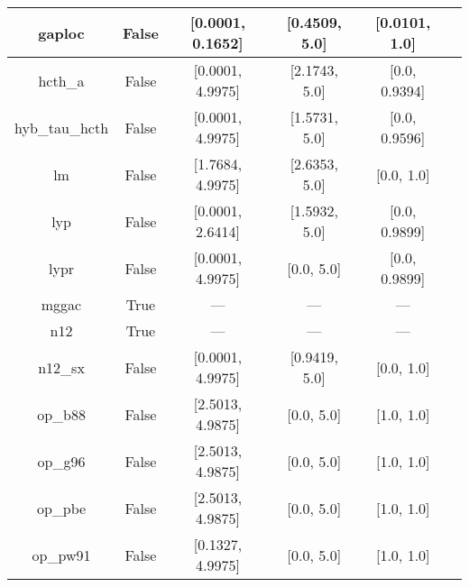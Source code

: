 \begin{tabular}{|c|c|c|c|c|l|}
        gaploc &                 False & [0.0001, 0.1652] &    [0.4509, 5.0] &    [0.0101, 1.0] &                                        \cite{Fabiano2014_2016} \\ \hline
       hcth\_a &                 False & [0.0001, 4.9975] &    [2.1743, 5.0] &    [0.0, 0.9394] &                                      \cite{Hamprecht1998_6264} \\ \hline
hyb\_tau\_hcth &                 False & [0.0001, 4.9975] &    [1.5731, 5.0] &    [0.0, 0.9596] &                                          \cite{Boese2002_9559} \\ \hline
            lm &                 False & [1.7684, 4.9975] &    [2.6353, 5.0] &       [0.0, 1.0] &                             \cite{Langreth1981_446,Hu1985_391} \\ \hline
           lyp &                 False & [0.0001, 2.6414] &    [1.5932, 5.0] &    [0.0, 0.9899] &                            \cite{Lee1988_785,Miehlich1989_200} \\ \hline
          lypr &                 False & [0.0001, 4.9975] &       [0.0, 5.0] &    [0.0, 0.9899] &                                             \cite{Ai2021_1207} \\ \hline
         mggac &                  True &              --- &              --- &              --- &                                        \cite{Patra2019_155140} \\ \hline
           n12 &                  True &              --- &              --- &              --- &                                       \cite{Peverati2012_2310} \\ \hline
       n12\_sx &                 False & [0.0001, 4.9975] &    [0.9419, 5.0] &       [0.0, 1.0] &                                      \cite{Peverati2012_16187} \\ \hline
       op\_b88 &                 False & [2.5013, 4.9875] &       [0.0, 5.0] &       [1.0, 1.0] &                                       \cite{Tsuneda1999_10664} \\ \hline
       op\_g96 &                 False & [2.5013, 4.9875] &       [0.0, 5.0] &       [1.0, 1.0] &                      \cite{Tsuneda1999_10664,Tsuneda1999_5656} \\ \hline
       op\_pbe &                 False & [2.5013, 4.9875] &       [0.0, 5.0] &       [1.0, 1.0] &                      \cite{Tsuneda1999_10664,Tsuneda1999_5656} \\ \hline
      op\_pw91 &                 False & [0.1327, 4.9975] &       [0.0, 5.0] &       [1.0, 1.0] &                      \cite{Tsuneda1999_10664,Tsuneda1999_5656} \\ \hline

\end{tabular}
